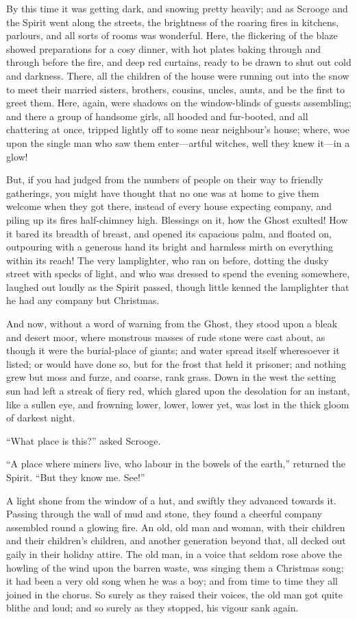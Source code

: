 \documentclass[paper=a5,BCOR=15mm,twoside,DIV=15,headinclude=off,12pt,chapterprefix=off,openany,headings=huge]{scrbook} %
\begin{document}
By this time it was getting dark, and snowing pretty heavily; and as Scrooge and the Spirit went along the streets, the brightness of the roaring fires in kitchens, parlours, and all sorts of rooms was wonderful. Here, the flickering of the blaze showed preparations for a cosy dinner, with hot plates baking through and through before the fire, and deep red curtains, ready to be drawn to shut out cold and darkness. There, all the children of the house were running out into the snow to meet their married sisters, brothers, cousins, uncles, aunts, and be the first to greet them. Here, again, were shadows on the window-blinds of guests assembling; and there a group of handsome girls, all hooded and fur-booted, and all chattering at once, tripped lightly off to some near neighbour's house; where, woe upon the single man who saw them enter—artful witches, well they knew it—in a glow!

But, if you had judged from the numbers of people on their way to friendly gatherings, you might have thought that no one was at home to give them welcome when they got there, instead of every house expecting company, and piling up its fires half-chimney high. Blessings on it, how the Ghost exulted! How it bared its breadth of breast, and opened its capacious palm, and floated on, outpouring with a generous hand its bright and harmless mirth on everything within its reach! The very lamplighter, who ran on before, dotting the dusky street with specks of light, and who was dressed to spend the evening somewhere, laughed out loudly as the Spirit passed, though little kenned the lamplighter that he had any company but Christmas.

And now, without a word of warning from the Ghost, they stood upon a bleak and desert moor, where monstrous masses of rude stone were cast about, as though it were the burial-place of giants; and water spread itself wheresoever it listed; or would have done so, but for the frost that held it prisoner; and nothing grew but moss and furze, and coarse, rank grass. Down in the west the setting sun had left a streak of fiery red, which glared upon the desolation for an instant, like a sullen eye, and frowning lower, lower, lower yet, was lost in the thick gloom of darkest night.

\enquote{What place is this?} asked Scrooge.

\enquote{A place where miners live, who labour in the bowels of the earth,} returned the Spirit. \enquote{But they know me. See!}

A light shone from the window of a hut, and swiftly they advanced towards it. Passing through the wall of mud and stone, they found a cheerful company assembled round a glowing fire. An old, old man and woman, with their children and their children's children, and another generation beyond that, all decked out gaily in their holiday attire. The old man, in a voice that seldom rose above the howling of the wind upon the barren waste, was singing them a Christmas song; it had been a very old song when he was a boy; and from time to time they all joined in the chorus. So surely as they raised their voices, the old man got quite blithe and loud; and so surely as they stopped, his vigour sank again.
\end{document}
